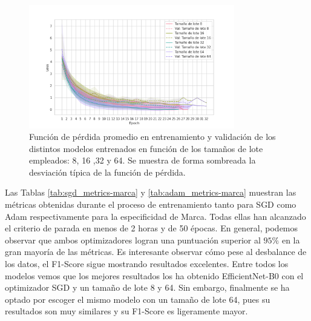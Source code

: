 \begin{figure}[H]
	\centering
	\includegraphics[width=0.8\textwidth]{img/loss-batch-marca-modelo.png}
	\caption{Función de pérdida promedio en entrenamiento y validación de los
		distintos modelos entrenados en función de los tamaños de lote empleados: 8,
		16 ,32 y 64. Se muestra de forma sombreada la desviación típica de la función de
		pérdida.}
	\label{fig:loss-batch-mm}
\end{figure}

Las Tablas \ref{tab:sgd_metrics-marca} y \ref{tab:adam_metrics-marca} muestran
las métricas obtenidas durante el proceso de entrenamiento tanto para SGD como
Adam respectivamente para la especificidad de Marca. Todas ellas han alcanzado el
criterio de parada en menos de 2 horas y de 50 épocas. En general, podemos observar
que ambos optimizadores logran una puntuación superior al $95\%$ en la gran mayoría
de las métricas. Es interesante observar cómo pese al desbalance de los datos, el
F1-Score sigue mostrando resultados excelentes. Entre todos los modelos vemos
que los mejores resultados los ha obtenido EfficientNet-B0 con el optimizador
SGD y un tamaño de lote 8 y 64. Sin embargo, finalmente se ha optado por escoger
el mismo modelo con un tamaño de lote 64, pues su resultados son muy similares y
su F1-Score es ligeramente mayor.

